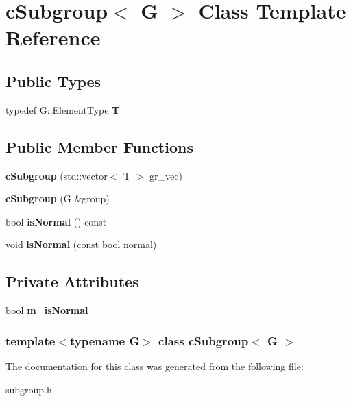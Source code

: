 \hypertarget{classcSubgroup}{\section{c\-Subgroup$<$ \-G $>$ \-Class \-Template \-Reference}
\label{classcSubgroup}
}
\subsection*{\-Public \-Types}
\begin{DoxyCompactItemize}
\item 
\hypertarget{classcSubgroup_ab88b056e488e5b0b6c7849e9a4357371}{typedef \-G\-::\-Element\-Type {\bfseries \-T}}\label{classcSubgroup_ab88b056e488e5b0b6c7849e9a4357371}

\end{DoxyCompactItemize}
\subsection*{\-Public \-Member \-Functions}
\begin{DoxyCompactItemize}
\item 
\hypertarget{classcSubgroup_aa47db239ee5fc0c2904fc5870e102daa}{{\bfseries c\-Subgroup} (std\-::vector$<$ \-T $>$ gr\-\_\-vec)}\label{classcSubgroup_aa47db239ee5fc0c2904fc5870e102daa}

\item 
\hypertarget{classcSubgroup_ad10d7eaf034a3f96bfdb84e824f7ba30}{{\bfseries c\-Subgroup} (\-G \&group)}\label{classcSubgroup_ad10d7eaf034a3f96bfdb84e824f7ba30}

\item 
\hypertarget{classcSubgroup_a5c239313a0f1ae9ae64f87da3c552bee}{bool {\bfseries is\-Normal} () const }\label{classcSubgroup_a5c239313a0f1ae9ae64f87da3c552bee}

\item 
\hypertarget{classcSubgroup_a39fa2b6d316997d9ecbb2fc51cf86bc6}{void {\bfseries is\-Normal} (const bool normal)}\label{classcSubgroup_a39fa2b6d316997d9ecbb2fc51cf86bc6}

\end{DoxyCompactItemize}
\subsection*{\-Private \-Attributes}
\begin{DoxyCompactItemize}
\item 
\hypertarget{classcSubgroup_a21daac84974df25a48465da9438cb552}{bool {\bfseries m\-\_\-is\-Normal}}\label{classcSubgroup_a21daac84974df25a48465da9438cb552}

\end{DoxyCompactItemize}
\subsubsection*{template$<$typename \-G$>$ class c\-Subgroup$<$ G $>$}



\-The documentation for this class was generated from the following file\-:\begin{DoxyCompactItemize}
\item 
subgroup.\-h\end{DoxyCompactItemize}
